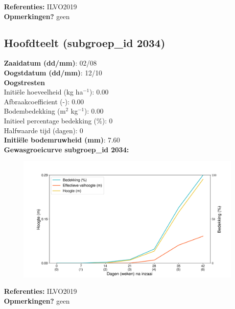 \documentclass{article}
\begin{document}
  \textbf{Referenties:} ILVO2019 \vspace{0.10cm} \\ 
  \textbf{Opmerkingen?} geen \vspace{0.10cm} \\ 
 \newpage 
 \subsection{Hoofdteelt (subgroep\_id 2034)} 
  \textbf{Zaaidatum (dd/mm)}: 02/08  \vspace{0.10cm} \\ 
  \textbf{Oogstdatum (dd/mm)}: 12/10  \vspace{0.10cm} \\ 
  \textbf{Oogstresten} \vspace{0.05cm} \\ 
  \tab Initi\"{e}le hoeveelheid (kg ha$^{-1}$): 0.00 \vspace{0.05cm} \\ 
  \tab Afbraakcoefficient (-): 0.00 \vspace{0.05cm} \\ 
  \tab Bodembedekking (m$^2$ kg$^{-1}$): 0.00 \vspace{0.05cm} \\ 
  \tab Initieel percentage bedekking (\%): 0 \vspace{0.05cm} \\ 
  \tab Halfwaarde tijd (dagen): 0 \vspace{0.05cm} \\ 
  \textbf{Initi\"{e}le bodemruwheid (mm)}: 7.60 \vspace{0.05cm} \\ 
  \textbf{Gewasgroeicurve subgroep\_id 2034:} 
 \begin{center} \begin{figure}[H] \includegraphics[width=12.5cm]{temp/2034.png} \end{figure} \end{center} 
  \textbf{Referenties:} ILVO2019 \vspace{0.10cm} \\ 
  \textbf{Opmerkingen?} geen \vspace{0.10cm} \\ 
 \newpage 
\end{document}
